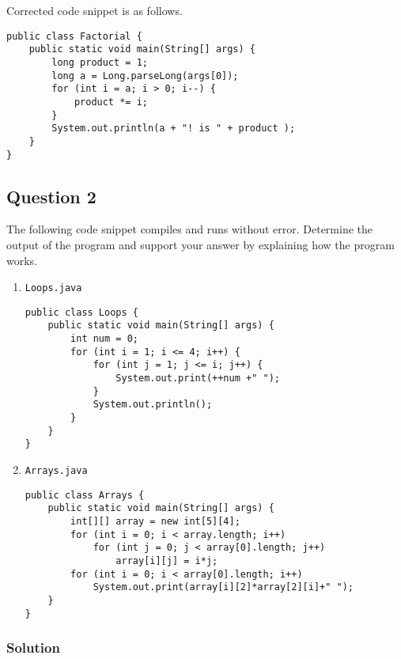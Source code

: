 \documentclass[12pt,letterpaper,twoside]{article}
\begin{document}
Corrected code snippet is as follows.

\lstset{language=java, tabsize=2}
\begin{lstlisting}
public class Factorial {
	public static void main(String[] args) {
		long product = 1;
		long a = Long.parseLong(args[0]);
		for (int i = a; i > 0; i--) {
			product *= i;
		}
		System.out.println(a + "! is " + product );
	}
}
\end{lstlisting}

\subsection*{Question 2}

The following code snippet compiles and runs without error. Determine the output of the program and support your answer by explaining how the program works.

\begin{enumerate}[label=(\alph*)]
\item \texttt{Loops.java}
\lstset{language=java, tabsize=2}
\begin{lstlisting}
public class Loops {
	public static void main(String[] args) {
		int num = 0;
		for (int i = 1; i <= 4; i++) {
			for (int j = 1; j <= i; j++) {
				System.out.print(++num +" ");
			}
			System.out.println();
		}
	}
}
\end{lstlisting}
\item \texttt{Arrays.java}
\lstset{language=java, tabsize=2}
\begin{lstlisting}
public class Arrays {
	public static void main(String[] args) {
		int[][] array = new int[5][4];
		for (int i = 0; i < array.length; i++)
			for (int j = 0; j < array[0].length; j++)
				array[i][j] = i*j;
		for (int i = 0; i < array[0].length; i++)
			System.out.print(array[i][2]*array[2][i]+" ");
	}
}
\end{lstlisting}
\end{enumerate}

\subsubsection*{Solution}
\end{document}
